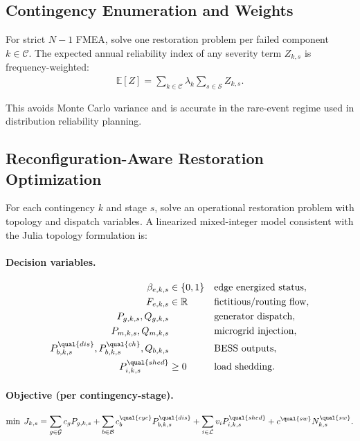 \subsection{Contingency Enumeration and Weights}

For strict \(N-1\) FMEA, solve one restoration problem per failed component
\(k\in\mathcal{C}\). The expected annual reliability index of any severity term
\(Z_{k,s}\) is frequency-weighted:
\begin{align}
\mathbb{E}[Z] = \sum_{k\in\mathcal{C}} \lambda_k \sum_{s\in\mathcal{S}} Z_{k,s}.
\label{eq:fmea-frequency-weighting}
\end{align}

This avoids Monte Carlo variance and is accurate in the rare-event regime used
in distribution reliability planning.

\subsection{Reconfiguration-Aware Restoration Optimization}

For each contingency \(k\) and stage \(s\), solve an operational restoration
problem with topology and dispatch variables. A linearized mixed-integer model
consistent with the Julia topology formulation is:

\paragraph{Decision variables.}
\begin{align}
\beta_{e,k,s} &\in \{0,1\} && \text{edge energized status}, \\
F_{e,k,s} &\in \mathbb{R} && \text{fictitious/routing flow}, \\
P_{g,k,s},Q_{g,k,s} & && \text{generator dispatch}, \\
P_{m,k,s},Q_{m,k,s} & && \text{microgrid injection}, \\
P_{b,k,s}^{\qual{dis}},P_{b,k,s}^{\qual{ch}},Q_{b,k,s} & && \text{BESS outputs}, \\
P^{\qual{shed}}_{i,k,s} &\ge 0 && \text{load shedding}.
\end{align}

\paragraph{Objective (per contingency-stage).}
\begin{align}
\min\; J_{k,s} =
\sum_{g\in\mathcal{G}} c_g P_{g,k,s}
+ \sum_{b\in\mathcal{B}} c_b^{\qual{cyc}} P_{b,k,s}^{\qual{dis}}
+ \sum_{i\in\mathcal{L}} v_i P^{\qual{shed}}_{i,k,s}
+ c^{\qual{sw}} N^{\qual{sw}}_{k,s}.
\label{eq:restoration-objective}
\end{align}

